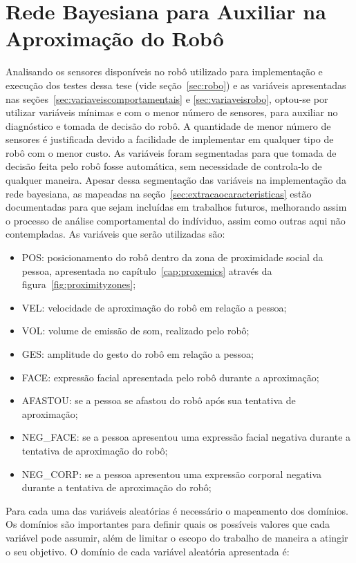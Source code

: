 \section{Rede Bayesiana para Auxiliar na Aproximação do Robô}
\label{sec:rede-bayesiana}

Analisando os sensores disponíveis no robô utilizado para implementação e execução dos testes dessa tese (vide seção~\ref{sec:robo}) e as variáveis apresentadas nas seções~\ref{sec:variaveiscomportamentais} e \ref{sec:variaveisrobo}, optou-se por utilizar variáveis mínimas e com o menor número de sensores, para auxiliar no diagnóstico e tomada de decisão do robô. A quantidade de menor número de sensores é justificada devido a facilidade de implementar em qualquer tipo de robô com o menor custo. As variáveis foram segmentadas para que tomada de decisão feita pelo robô fosse automática, sem necessidade de controla-lo de qualquer maneira. Apesar dessa segmentação das variáveis na implementação da rede bayesiana, as mapeadas na seção~\ref{sec:extracaocaracteristicas} estão documentadas para que sejam incluídas em trabalhos futuros, melhorando assim o processo de análise comportamental do indíviduo, assim como outras aqui não contempladas. As variáveis que serão utilizadas são:

\begin{itemize}
	\item POS: posicionamento do robô dentro da zona de proximidade social da pessoa, apresentada no capítulo~\ref{cap:proxemics} através da figura~\ref{fig:proximityzones};
	\item VEL: velocidade de aproximação do robô em relação a pessoa;
	\item VOL: volume de emissão de som, realizado pelo robô;
	\item GES: amplitude do gesto do robô em relação a pessoa;
	\item FACE: expressão facial apresentada pelo robô durante a aproximação;
	\item AFASTOU: se a pessoa se afastou do robô após sua tentativa de aproximação;
	\item NEG\_FACE: se a pessoa apresentou uma expressão facial negativa durante a tentativa de aproximação do robô;
	\item NEG\_CORP: se a pessoa apresentou uma expressão corporal negativa durante a tentativa de aproximação do robô;
\end{itemize}

Para cada uma das variáveis aleatórias é necessário o mapeamento dos domínios. Os domínios são importantes para definir quais os possíveis valores que cada variável pode assumir, além de limitar o escopo do trabalho de maneira a atingir o seu objetivo. O domínio de cada variável aleatória apresentada é:

